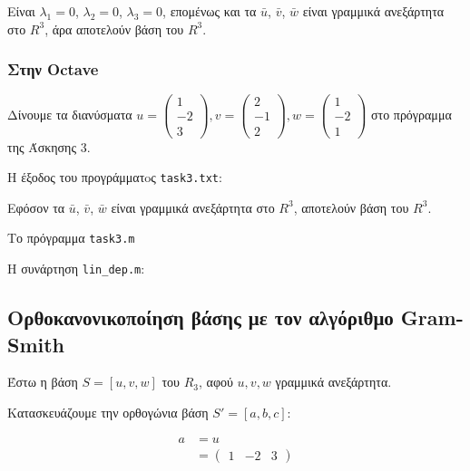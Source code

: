 \documentclass[12pt, fleqn, leqno]{extreport}
\begin{document}
Είναι $\lambda_{1}=0$, $\lambda_{2}=0$, $\lambda_{3}=0$, επομένως και τα $\bar{u}$, $\bar{v}$, $\bar{w}$ είναι γραμμικά ανεξάρτητα στο $R^{3}$, άρα αποτελούν βάση του $R^{3}$.

\newpage
\subsubsection{Στην Octave}

Δίνουμε τα διανύσματα
$
    u = \begin{pmatrix}
        1 \\ -2 \\ 3
    \end{pmatrix},
    v = \begin{pmatrix}
        2 \\ -1 \\ 2
    \end{pmatrix},
    w = \begin{pmatrix}
        1 \\ -2 \\ 1
    \end{pmatrix}
$
στο πρόγραμμα της Άσκησης 3.

Η έξοδος του προγράμματoς \lstinline[language={}]{task3.txt}:


Εφόσον τα $\bar{u}$, $\bar{v}$, $\bar{w}$ είναι γραμμικά ανεξάρτητα στο $R^{3}$, αποτελούν βάση του $R^{3}$.

Το πρόγραμμα \lstinline[language={}]{task3.m}


Η συνάρτηση \lstinline[language={}]{lin_dep.m}:



\newpage
\subsection{Ορθοκανονικοποίηση βάσης με τον αλγόριθμο Gram-Smith}

Έστω η βάση $S=[u, v, w]$ του $R_{3}$, αφού $u, v, w$ γραμμικά ανεξάρτητα.

Κατασκευάζουμε την ορθογώνια βάση $S'=[a, b, c]$:

\begin{equation}
    \begin{split}
        a &= u
        \\&=
        \begin{pmatrix}
            1 & -2 & 3
        \end{pmatrix}
    \end{split}
\end{equation}
\end{document}
